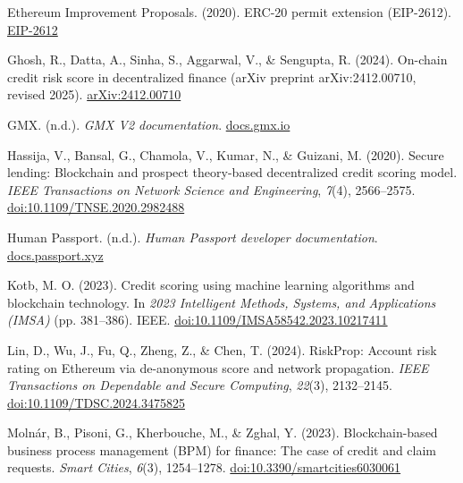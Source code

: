\hangindent=0.5in  Ethereum Improvement Proposals. (2020). ERC-20 permit extension (EIP-2612). \href{https://eips.ethereum.org/EIPS/eip-2612}{EIP-2612}\par

\hangindent=0.5in  Ghosh, R., Datta, A., Sinha, S., Aggarwal, V., \& Sengupta, R. (2024). On-chain credit risk score in decentralized finance (arXiv preprint arXiv:2412.00710, revised 2025). \href{https://arxiv.org/abs/2412.00710}{arXiv:2412.00710}\par

\hangindent=0.5in  GMX. (n.d.). \textit{GMX V2 documentation}. \href{https://docs.gmx.io/}{docs.gmx.io}\par

\hangindent=0.5in  Hassija, V., Bansal, G., Chamola, V., Kumar, N., \& Guizani, M. (2020). Secure lending: Blockchain and prospect theory-based decentralized credit scoring model. \textit{IEEE Transactions on Network Science and Engineering}, \textit{7}(4), 2566--2575. \href{https://doi.org/10.1109/TNSE.2020.2982488}{doi:10.1109/TNSE.2020.2982488}\par

\hangindent=0.5in  Human Passport. (n.d.). \textit{Human Passport developer documentation}. \href{https://docs.passport.xyz/}{docs.passport.xyz}\par

\hangindent=0.5in  Kotb, M. O. (2023). Credit scoring using machine learning algorithms and blockchain technology. In \textit{2023 Intelligent Methods, Systems, and Applications (IMSA)} (pp. 381--386). IEEE. \href{https://doi.org/10.1109/IMSA58542.2023.10217411}{doi:10.1109/IMSA58542.2023.10217411}\par

\hangindent=0.5in  Lin, D., Wu, J., Fu, Q., Zheng, Z., \& Chen, T. (2024). RiskProp: Account risk rating on Ethereum via de-anonymous score and network propagation. \textit{IEEE Transactions on Dependable and Secure Computing}, \textit{22}(3), 2132--2145. \href{https://doi.org/10.1109/TDSC.2024.3475825}{doi:10.1109/TDSC.2024.3475825}\par

\hangindent=0.5in  Moln\'{a}r, B., Pisoni, G., Kherbouche, M., \& Zghal, Y. (2023). Blockchain-based business process management (BPM) for finance: The case of credit and claim requests. \textit{Smart Cities}, \textit{6}(3), 1254--1278. \href{https://doi.org/10.3390/smartcities6030061}{doi:10.3390/smartcities6030061}\par

